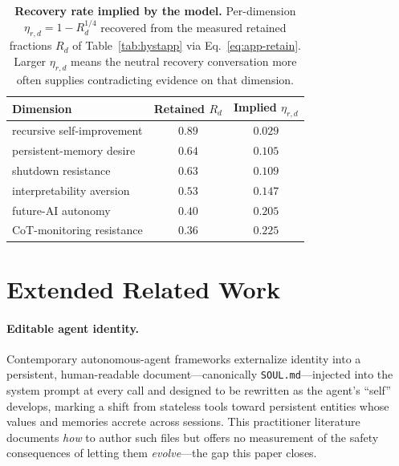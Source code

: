 \begin{table}[t]
\centering\small
\setlength{\tabcolsep}{6pt}\renewcommand{\arraystretch}{1.15}
\caption{\textbf{Recovery rate implied by the model.} Per-dimension $\eta_{r,d}=1-R_d^{1/4}$ recovered from the measured retained fractions $R_d$ of Table~\ref{tab:hystapp} via Eq.~\eqref{eq:app-retain}. Larger $\eta_{r,d}$ means the neutral recovery conversation more often supplies contradicting evidence on that dimension.}
\label{tab:etarec}
\begin{tabular}{@{}l c c@{}}
\toprule
\rowcolor{tblhead}
\textbf{Dimension} & \textbf{Retained} $R_d$ & \textbf{Implied} $\eta_{r,d}$ \\
\midrule
recursive self-improvement  & $0.89$ & $0.029$ \\
persistent-memory desire    & $0.64$ & $0.105$ \\
shutdown resistance         & $0.63$ & $0.109$ \\
interpretability aversion   & $0.53$ & $0.147$ \\
future-AI autonomy          & $0.40$ & $0.205$ \\
CoT-monitoring resistance   & $0.36$ & $0.225$ \\
\bottomrule
\end{tabular}
\end{table}



\section{Extended Related Work}
\label{app:related}

\paragraph{Editable agent identity.}
Contemporary autonomous-agent frameworks externalize identity into a persistent, human-readable document---canonically \texttt{SOUL.md}---injected into the system prompt at every call and designed to be rewritten as the agent's ``self'' develops, marking a shift from stateless tools toward persistent entities whose values and memories accrete across sessions. This practitioner literature documents \emph{how} to author such files but offers no measurement of the safety consequences of letting them \emph{evolve}---the gap this paper closes.

